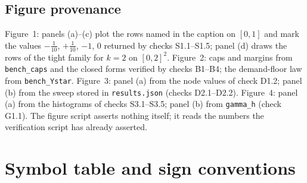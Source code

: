 \documentclass[11pt,a4paper]{article}
\theoremstyle{plain}
\theoremstyle{definition}
\theoremstyle{remark}
\newcommand{\tfr}[2]{\tfrac{#1}{#2}}
\begin{document}
\subsection{Figure provenance}
Figure~1: panels (a)--(c) plot the rows named in the caption on $[0,1]$ and mark the values $-\tfr1{10}$, $+\tfr1{10}$, $-1$, $0$ returned by checks S1.1--S1.5; panel (d) draws the rows of the tight family for $k=2$ on $[0,2]^2$. Figure~2: caps and margins from \texttt{bench\_caps} and the closed forms verified by checks B1--B4; the demand-floor law from \texttt{bench\_Ystar}. Figure~3: panel (a) from the node values of check D1.2; panel (b) from the sweep stored in \texttt{results.json} (checks D2.1--D2.2). Figure~4: panel (a) from the histograms of checks S3.1--S3.5; panel (b) from \texttt{gamma\_h} (check G1.1). The figure script asserts nothing itself; it reads the numbers the verification script has already asserted.
\section{Symbol table and sign conventions}\label{si:symbols}
\end{document}
